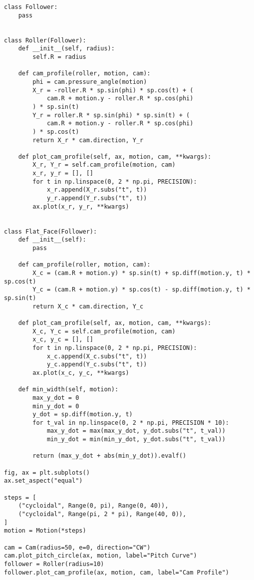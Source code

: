 \documentclass[12pt]{article}
\begin{document}
\begin{lstlisting}
class Follower:
    pass


class Roller(Follower):
    def __init__(self, radius):
        self.R = radius

    def cam_profile(roller, motion, cam):
        phi = cam.pressure_angle(motion)
        X_r = -roller.R * sp.sin(phi) * sp.cos(t) + (
            cam.R + motion.y - roller.R * sp.cos(phi)
        ) * sp.sin(t)
        Y_r = roller.R * sp.sin(phi) * sp.sin(t) + (
            cam.R + motion.y - roller.R * sp.cos(phi)
        ) * sp.cos(t)
        return X_r * cam.direction, Y_r

    def plot_cam_profile(self, ax, motion, cam, **kwargs):
        X_r, Y_r = self.cam_profile(motion, cam)
        x_r, y_r = [], []
        for t in np.linspace(0, 2 * np.pi, PRECISION):
            x_r.append(X_r.subs("t", t))
            y_r.append(Y_r.subs("t", t))
        ax.plot(x_r, y_r, **kwargs)


class Flat_Face(Follower):
    def __init__(self):
        pass

    def cam_profile(roller, motion, cam):
        X_c = (cam.R + motion.y) * sp.sin(t) + sp.diff(motion.y, t) * sp.cos(t)
        Y_c = (cam.R + motion.y) * sp.cos(t) - sp.diff(motion.y, t) * sp.sin(t)
        return X_c * cam.direction, Y_c

    def plot_cam_profile(self, ax, motion, cam, **kwargs):
        X_c, Y_c = self.cam_profile(motion, cam)
        x_c, y_c = [], []
        for t in np.linspace(0, 2 * np.pi, PRECISION):
            x_c.append(X_c.subs("t", t))
            y_c.append(Y_c.subs("t", t))
        ax.plot(x_c, y_c, **kwargs)

    def min_width(self, motion):
        max_y_dot = 0
        min_y_dot = 0
        y_dot = sp.diff(motion.y, t)
        for t_val in np.linspace(0, 2 * np.pi, PRECISION * 10):
            max_y_dot = max(max_y_dot, y_dot.subs("t", t_val))
            min_y_dot = min(min_y_dot, y_dot.subs("t", t_val))

        return (max_y_dot + abs(min_y_dot)).evalf()

fig, ax = plt.subplots()
ax.set_aspect("equal")

steps = [
    ("cycloidal", Range(0, pi), Range(0, 40)),
    ("cycloidal", Range(pi, 2 * pi), Range(40, 0)),
]
motion = Motion(*steps)

cam = Cam(radius=50, e=0, direction="CW")
cam.plot_pitch_circle(ax, motion, label="Pitch Curve")
follower = Roller(radius=10)
follower.plot_cam_profile(ax, motion, cam, label="Cam Profile")


\end{lstlisting}
\end{document}
